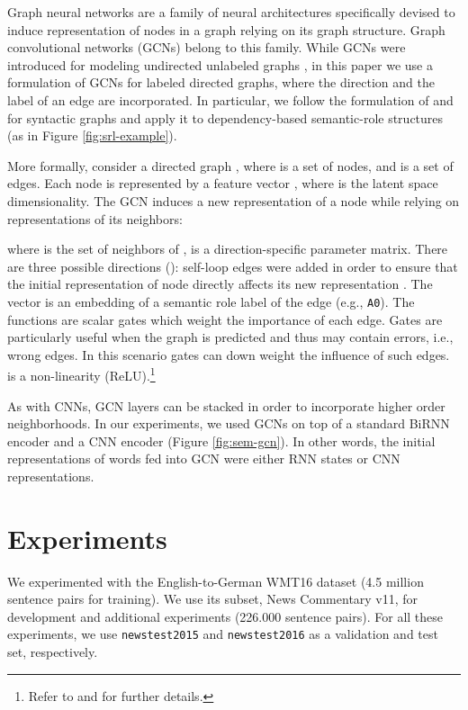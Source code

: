 \documentclass[11pt,a4paper]{article}
\begin{document}
Graph neural networks are a family of neural architectures \cite{scarselli2009graph,DBLP:conf/icml/GilmerSRVD17} specifically devised to induce representation of nodes in a graph relying on its graph structure.
Graph convolutional networks (GCNs) belong to this family.
While GCNs were introduced for modeling undirected unlabeled graphs \cite{kipf2016semigraphconv}, in this paper we use a formulation of GCNs for labeled directed graphs, where the direction and the label of an edge are incorporated.
In particular, we follow the formulation of  and  for syntactic graphs and apply it to dependency-based semantic-role structures \cite{DBLP:conf/conll/HajicCJKMMMNPSSSXZ09} (as in  Figure \ref{fig:srl-example}).

More formally, consider a directed graph , where  is a set of nodes, and  is a set of edges. 
Each node  is represented by a feature vector , where  is the latent space dimensionality.
The GCN induces a new representation  of a node  while relying on representations  of its neighbors:

where  is the set of neighbors of ,  is a direction-specific parameter matrix. 
There are three possible directions (): self-loop edges were added in order to ensure that the initial representation of node  directly affects its new representation . 
The vector  is an embedding of a semantic role label of the edge  (e.g., {\tt A0}). 
The functions  are scalar gates which weight the importance of each edge.
Gates are particularly useful when the graph is predicted and thus may contain errors, i.e., wrong edges.
In this scenario gates can down weight the influence of such edges. 
 is a non-linearity (ReLU).\footnote{Refer to  and  for further details.}

As with CNNs, GCN layers can be stacked in order to incorporate higher order neighborhoods. 
In our experiments, we used GCNs on top of a standard BiRNN encoder and a CNN encoder (Figure \ref{fig:sem-gcn}). 
In other words, the initial representations of words fed into GCN were either RNN states or CNN representations.

\section{Experiments} 
We experimented with the English-to-German WMT16 dataset (4.5 million sentence pairs for training).
We use its subset, News Commentary v11, for development and additional experiments (226.000 sentence pairs).
For all these experiments, we use \texttt{newstest2015} and \texttt{newstest2016} as a validation and test set, respectively.
\end{document}
